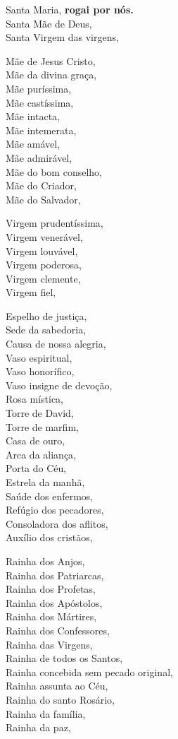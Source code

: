 \documentclass[10pt,a5paper]{book}
\begin{document}
\begin{multicols}{2}
Santa Maria, \textbf{rogai por nós.} \\
Santa Mãe de Deus, \\
Santa Virgem das virgens,

Mãe de Jesus Cristo, \\
Mãe da divina graça, \\
Mãe puríssima, \\
Mãe castíssima, \\
Mãe intacta, \\
Mãe intemerata, \\
Mãe amável, \\
Mãe admirável, \\
Mãe do bom conselho, \\
Mãe do Criador, \\
Mãe do Salvador,

Virgem prudentíssima, \\
Virgem venerável, \\
Virgem louvável, \\
Virgem poderosa, \\
Virgem clemente, \\
Virgem fiel,

Espelho de justiça, \\
Sede da sabedoria, \\
Causa de nossa alegria, \\
Vaso espiritual, \\
Vaso honorífico, \\
Vaso insigne de devoção, \\
Rosa mística, \\
Torre de David, \\
Torre de marfim, \\
Casa de ouro, \\
Arca da aliança, \\
Porta do Céu, \\
Estrela da manhã, \\
Saúde dos enfermos, \\
Refúgio dos pecadores, \\
Consoladora dos aflitos, \\
Auxílio dos cristãos,

Rainha dos Anjos, \\
Rainha dos Patriarcas, \\
Rainha dos Profetas, \\
Rainha dos Apóstolos, \\
Rainha dos Mártires, \\
Rainha dos Confessores, \\
Rainha das Virgens, \\
Rainha de todos os Santos, \\
Rainha concebida sem pecado original, \\
Rainha assunta ao Céu, \\
Rainha do santo Rosário, \\
Rainha da família, \\
Rainha da paz,
\end{multicols}
\end{document}
